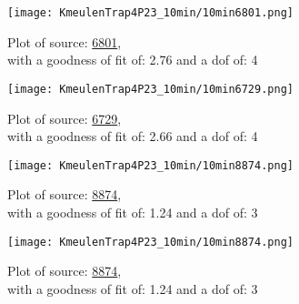 \documentclass{article}
\begin{document}
\begin{figure}[H]
    \centering
    \begin{minipage}{.5\textwidth}
        \centering
        \texttt{[image: KmeulenTrap4P23\_10min/10min6801.png]}
        \captionsetup{labelformat=empty}
        \caption{Plot of source: \href{http://banana.transientskp.org/r4/vlo_KmeulenTrap4P23/runningcatalog/6801}{6801},\\with a goodness of fit of: 2.76 and a dof of: 4}
        \addtocounter{figure}{-1}
        \label{KmeulenTrap4P23:10min:6801:plot}
    \end{minipage}%
    \begin{minipage}{0.5\textwidth}
        \centering

        \texttt{[image: KmeulenTrap4P23\_10min/10min6729.png]}
        \captionsetup{labelformat=empty}
        \caption{Plot of source: \href{http://banana.transientskp.org/r4/vlo_KmeulenTrap4P23/runningcatalog/6729}{6729},\\with a goodness of fit of: 2.66 and a dof of: 4}
    \addtocounter{figure}{-1}
    \label{KmeulenTrap4P23:10min:6729:plot}
    \end{minipage}
\end{figure}
\begin{figure}[H]
    \centering
    \begin{minipage}{.5\textwidth}
        \centering
        \texttt{[image: KmeulenTrap4P23\_10min/10min8874.png]}
        \captionsetup{labelformat=empty}
        \caption{Plot of source: \href{http://banana.transientskp.org/r4/vlo_KmeulenTrap4P23/runningcatalog/8874}{8874},\\with a goodness of fit of: 1.24 and a dof of: 3}
        \addtocounter{figure}{-1}
        \label{KmeulenTrap4P23:10min:8874:plot}
    \end{minipage}%
    \begin{minipage}{0.5\textwidth}
        \centering

        \texttt{[image: KmeulenTrap4P23\_10min/10min8874.png]}
        \captionsetup{labelformat=empty}
        \caption{Plot of source: \href{http://banana.transientskp.org/r4/vlo_KmeulenTrap4P23/runningcatalog/8874}{8874},\\with a goodness of fit of: 1.24 and a dof of: 3}
    \addtocounter{figure}{-1}
    \label{KmeulenTrap4P23:10min:8874:plot}
    \end{minipage}
\end{figure}
\end{document}
